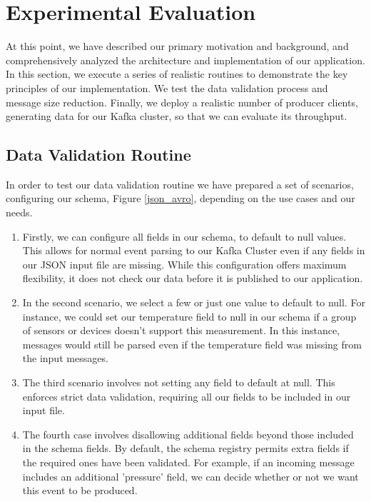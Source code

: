 \chapter{Experimental Evaluation}
\label{chap5}

At this point, we have described our primary motivation and background, and comprehensively analyzed the architecture and implementation of our application. In this section, we execute a series of realistic routines to demonstrate the key principles of our implementation. We test the data validation process and message size reduction. Finally, we deploy a realistic number of producer clients, generating data for our Kafka cluster, so that we can evaluate its throughput. 

\section{Data Validation Routine}

In order to test our data validation routine we have prepared a set of scenarios, configuring our schema, Figure \ref{json_avro}, depending on the use cases and our needs.

\begin{enumerate}
    \item Firstly, we can configure all fields in our schema, to default to null values. This allows for normal event parsing to our Kafka Cluster even if any fields in our JSON input file are missing. While this configuration offers maximum flexibility, it does not check our data before it is published to our application.
    \item In the second scenario, we select a few or just one value to default to null. For instance, we could set our temperature field to null in our schema if a group of sensors or devices doesn't support this measurement. In this instance, messages would still be parsed even if the temperature field was missing from the input messages.
    \item The third scenario involves not setting any field to default at null. This enforces strict data validation, requiring all our fields to be included in our input file.
    \item The fourth case involves disallowing additional fields beyond those included in the schema fields. By default, the schema registry permits extra fields if the required ones have been validated. For example, if an incoming message includes an additional 'pressure' field, we can decide whether or not we want this event to be produced.
\end{enumerate}

